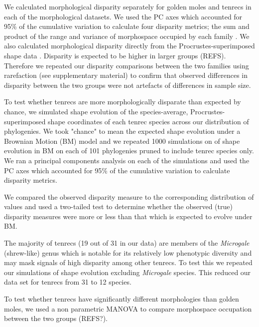 \documentclass[12pt,a4paper]{article}
\begin{document}
We calculated morphological disparity separately for golden moles and tenrecs in each of the morphological datasets. We used the PC axes which accounted for 95\% of the cumulative variation to calculate four disparity metrics; the sum and product of the range and variance of morphospace occupied by each family \citep{Brusatte2008, Foth2012, Ruta2013}. We also calculated morphological disparity directly from the Procrustes-superimposed shape data \citep[ZelditchMD,][]{Zelditch2012}. 
Disparity is expected to be higher in larger groups (REFS). Therefore we repeated our disparity comparisons between the two families using rarefaction (see supplementary material) to confirm that observed differences in disparity between the two groups were not artefacts of differences in sample size.

To test whether tenrecs are more morphologically disparate than expected by chance, we simulated shape evolution  \citep{Harmon2008} of the species-average, Procrustes-superimposed shape coordinates of each tenrec species across our distribution of phylogenies. We took "chance" to mean the expected shape evolution under a Brownian Motion (BM) model and we repeated 1000 simulations on of shape evolution in BM on each of 101 phylogenies pruned to include tenrec species only. We ran a principal components analysis on each of the simulations and used the PC axes which accounted for 95\% of the cumulative variation to calculate disparity metrics.

We compared the observed disparity measure to the corresponding distribution of values and used a two-tailed test to determine whether the observed (true) disparity measures were more or less than that which is expected to evolve under BM.

The majority of tenrecs (19 out of 31 in our data) are members of the \textit{Microgale} (shrew-like) genus which is notable for its relatively low phenotypic diversity \citep{ Soarimalala2011, Jenkins2003} and may mask signals of high disparity among other tenrecs. To test this we repeated our simulations of shape evolution excluding \textit{Microgale} species. This reduced our data set for tenrecs from 31 to 12 species. 

To test whether tenrecs have significantly different morphologies than golden moles, we used a non parametric MANOVA \citep{Anderson2001} to compare morphospace occupation between the two groups (REFS?). %
\end{document}
